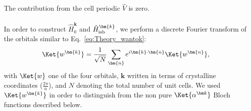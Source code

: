 The contribution from the cell periodic $\hat{V}$ is zero.
\\\\
In order to construct $\hat{H}_0^{\bm{k}}$ and $\hat{H}_{\rm isb}^{\bm{k}}$, we perform a discrete Fourier transform of the orbitals similar to Eq.~\eqref{eq:Theory_wantok}:
\begin{equation}
	\label{eq:Rashba_wantok}
	\Ket{w^{\bm{k}}} = \frac{1}{\sqrt{N}}\sum_{\bm{n}} e^{i \bm{k}\cdot \bm{n}}\Ket{w^{\bm{n}}},
\end{equation}
with $\Ket{w}$ one of the four orbitals, $\bm{k}$ written in terms of crystalline coordinates ($\frac{2\pi}{a}$), and $N$ denoting the total number of unit cells. We used $\Ket{w^{\bm{k}}}$ in order to distinguish from the non pure $\Ket{\alpha^{\bm k}}$ Bloch functions described below.

